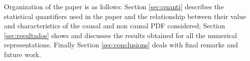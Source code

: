 Organization of the paper is as follows:
Section \ref{sec:quanti} describes the statistical quantifiers used in the paper and the relationship between their value and characteristics of the causal and non causal PDF considered;
Section \ref{sec:resultados} shows and discusses the results obtained for all the numerical representations.
Finally Section \ref{sec:conclusions} deals with final remarks and future work.